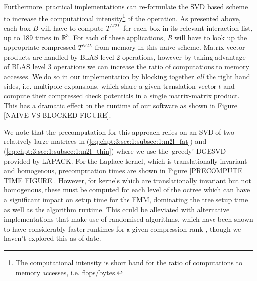 Furthermore, practical implementations can re-formulate the SVD based scheme to increase the computational intensity\footnote{The computational intensity is short hand for the ratio of computations to memory accesses, i.e. flops/bytes.} of the operation. As presented above, each box $B$ will have to compute $T^{M2L}$ for each box in its relevant interaction list, up to 189 times in $\mathbb{R}^3$. For each of these applications, $B$ will have to look up the appropriate compressed $T^{M2L}$ from memory in this naive scheme. Matrix vector products are handled by BLAS level 2 operations, however by taking advantage of BLAS level 3 operations we can increase the ratio of computations to memory accesses. We do so in our implementation by blocking together \textit{all} the right hand sides, i.e. multipole expansions, which share a given translation vector $t$ and compute their compressed check potentials in a single matrix-matrix product. This has a dramatic effect on the runtime of our software as shown in Figure [NAIVE VS BLOCKED FIGURE].

We note that the precomputation for this approach relies on an SVD of two relatively large matrices in (\ref{eq:chpt:3:sec:1:subsec:1:m2l_fat}) and (\ref{eq:chpt:3:sec:1:subsec:1:m2l_thin}) where we use the `greedy' DGESVD provided by LAPACK. For the Laplace kernel, which is translationally invariant and homogenous, precomputation times are shown in Figure [PRECOMPUTE TIME FIGURE]. However, for kernels which are translationally invariant but not homogenous, these must be computed for each level of the octree which can have a significant impact on setup time for the FMM, dominating the tree setup time as well as the algorithm runtime. This could be alleviated with alternative implementations that make use of randomised algorithms, which have been shown to have considerably faster runtimes for a given compression rank \cite{halko2011finding}, though we haven't explored this as of date.

